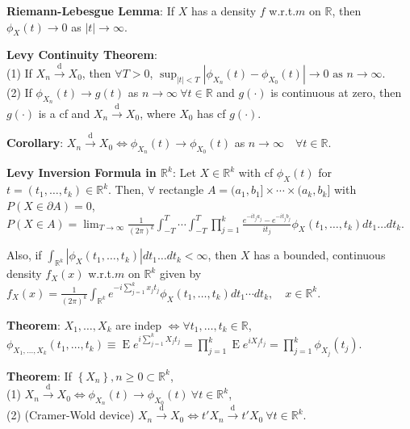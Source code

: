 \documentclass[paper=letter,fontsize=2.89mm]{scrartcl}
\DeclareMathOperator{\E}{E}
\newcommand{\convdist}{\stackrel{\text{d}}{\longrightarrow}}
\newcommand{\R}{\mathbb{R}}
\newcommand\abs[1]{\left| #1 \right|}
\newcommand\set[1]{\left\{ #1 \right\}}
\begin{document}
\begin{multicols*}{3}
\textbf{Riemann-Lebesgue Lemma}: If $X$ has a density $f$ w.r.t.\@ $m$ on $\R$, then $\phi_X(t) \to 0$ as $\abs{t} \to \infty$. \\ \medskip

\textbf{Levy Continuity Theorem}: \\
(1) If $X_n \convdist X_0$, then $\forall T > 0$, $\sup_{\abs{t} < T} \abs{\phi_{X_n}(t) - \phi_{X_0}(t)} \to 0 \text{ as } n \to \infty.$ \\ 
(2) If $\phi_{X_n}(t) \to g(t)$ as $n \to \infty ~ \forall t \in \R$ and $g(\cdot)$ is continuous at zero, then $g(\cdot)$ is a cf and $X_n \convdist X_0$, where $X_0$ has cf $g(\cdot)$. \\ \medskip

\textbf{Corollary}: $X_n \convdist X_0 \iff \phi_{X_n}(t) \to \phi_{X_0}(t)$ as $n \to \infty \quad \forall t \in \R$. \\ \medskip

\textbf{Levy Inversion Formula in $\R^k$}: Let $X \in \R^k$ with cf $\phi_X(t)$ for $t = (t_1, \dots, t_k) \in \R^k$. Then, $\forall$ rectangle $A = (a_1, b_1] \times \cdots \times (a_k, b_k]$ with $P(X \in \partial A) = 0$,\\
$P(X \in A) = \lim_{T\to\infty} \frac{1}{(2\pi)^k} \int_{-T}^T \cdots \int_{-T}^T \prod_{j=1}^k
\frac{e^{-it_ja_j} - e^{-it_jb_j}}{it_j} \phi_X(t_1, \dots, t_k)dt_1\dots dt_k.$ \\ \medskip

Also, if $\int_{\R^k} \abs{\phi_X(t_1,\dots,t_k)}dt_1\dots dt_k < \infty$, then $X$ has a bounded, continuous density $f_X(x)$ w.r.t.\@ $m$ on $\R^k$ given by\\
$f_X(x) = \frac{1}{(2\pi)^k} \int_{\R^k} e^{-i\sum_{j=1}^k x_jt_j}\phi_X(t_1, \dots, t_k)dt_1 \cdots dt_k, \quad x \in \R^k.$ \\ \medskip

\textbf{Theorem}: $X_1, \dots, X_k$ are indep  $ \iff \forall t_1, \dots, t_k \in \R$,
$\phi_{X_1, \dots, X_k}(t_1, \dots, t_k) \equiv \E e^{i\sum_{j=1}^k X_j t_j} =
\prod_{j=1}^k \E e^{iX_j t_j} = \prod_{j=1}^k \phi_{X_j}(t_j).$ \\ \medskip


\textbf{Theorem}: If $\set{X_n}, n \ge 0 \subset\R^k$, \\
(1) $X_n \convdist X_0 \iff \phi_{X_n}(t) \to \phi_{X_0}(t) ~ \forall t \in \R^k$, \\
(2)  (Cramer-Wold device) $X_n \convdist X_0 \iff t'X_n \convdist t' X_0 ~ \forall t \in \R^k$.



\end{multicols*}
\end{document}
